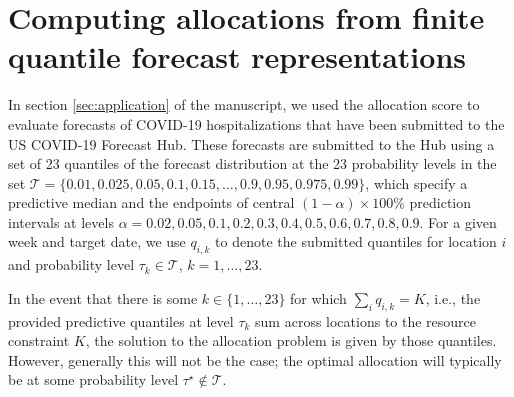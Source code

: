 \documentclass{article}
\begin{document}
\section{Computing allocations from finite quantile forecast representations}
\label{sec:distfromq}

In section \ref{sec:application} of the manuscript, we used the allocation score to evaluate forecasts of COVID-19 hospitalizations that have been submitted to the US COVID-19 Forecast Hub. These forecasts are submitted to the Hub using a set of 23 quantiles of the forecast distribution at the 23 probability levels in the set $\mathcal{T} = \{0.01, 0.025, 0.05, 0.1, 0.15, \ldots, \allowbreak 0.9, 0.95, 0.975, 0.99\}$, which specify a predictive median and the endpoints of central $(1 - \alpha) \times 100\%$ prediction intervals at levels $\alpha = 0.02, 0.05, 0.1, 0.2, \allowbreak 0.3, 0.4, 0.5, 0.6, \allowbreak 0.7, 0.8, 0.9$. For a given week and target date, we use $q_{i,k}$ to denote the submitted quantiles for location $i$ and probability level $\tau_k \in \mathcal{T}$, $k = 1, \ldots, 23$.

In the event that there is some $k \in \{1, \ldots, 23\}$ for which $\sum_i q_{i,k} = K$, i.e., the provided predictive quantiles at level $\tau_k$ sum across locations to the resource constraint $K$, the solution to the allocation problem is given by those quantiles. However, generally this will not be the case; the optimal allocation will typically be at some probability level $\tau^\star \notin \mathcal{T}$.
\end{document}

